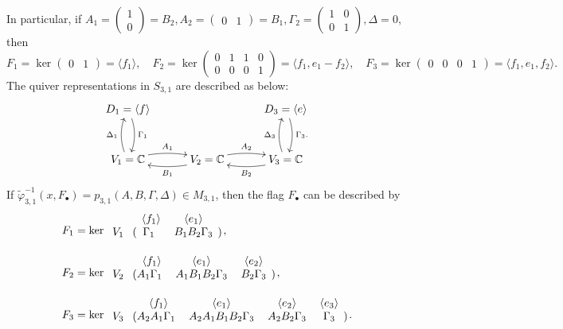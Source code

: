 \documentclass[11pt,reqno]{amsart}
\numberwithin{equation}{section}
\theoremstyle{definition}
\def\<{\langle}
\def\>{\rangle}
\newcommand{\inv}{^{-1}}
\newcommand{\tphi}{\widetilde{\varphi}}
\begin{document}
In particular, if 
$
A_1 = \begin{pmatrix}1 \\ 0\end{pmatrix} = B_2,
A_2 = \begin{pmatrix} 0 & 1 \end{pmatrix} = B_1,
\Gamma_2 = \begin{pmatrix}1&0\\0&1\end{pmatrix},
\Delta = 0,
$
then
\[
F_1 = \ker \begin{pmatrix} 0 & 1 \end{pmatrix} = \<f_1\>,
\quad
F_2 = \ker \begin{pmatrix} 0 & 1 &1& 0 \\ 0&0&0&1 \end{pmatrix} = \<f_1, e_1 - f_2\>,
\quad
F_3 = \ker \begin{pmatrix} 0 & 0 &0& 1  \end{pmatrix} = \<f_1, e_1, f_2\>.
\]
\endex
\ex
The quiver representations in $S_{3,1}$ are described as below:
\[
 \xymatrix@-1pc{
D_1=\<f\> \ar@/^/[dd]^{\Gamma_1} &&& &   D_3=\<e\>  \ar@/^/[dd]^{\Gamma_3.}  \\ 
 & & \\ 
V_1=\CC\ar@/^/[uu]^{\Delta_1} \ar@/^/[rr]^{A_1} 
& & \ar@/^/[ll]^{B_1}  V_2=\CC  \ar@/^/[rr]^{A_2}   
& & \ar@/^/[ll]^{B_2}  V_3=\CC  \ar@/^/[uu]^{\Delta_3}\\ 
 }
\] 
If $\tphi_{3,1}\inv(x, F_\bullet) =  p_{3,1}(A,B,\Gamma,\Delta) \in M_{3,1}$, then the flag $F_\bullet$ can be described by
\[
\begin{split}
F_1 &= 
 \ker \begin{blockarray}{ *{8}{c} }
 & \<f_1\> &\<e_1\>  \\
\begin{block}{ c @{\quad} ( @{\,} *{7}{c} @{\,} )}
V_{1}& 
\Gamma_1
&
B_1B_2\Gamma_3
\\
\end{block}
\end{blockarray}
\normalsize
~~~~~,
\\
F_2 &
= \ker \begin{blockarray}{ *{8}{c} }
 & \<f_1\> & \<e_1\>  & \<e_2\> \\
\begin{block}{ c @{\quad} ( @{\,} *{7}{c} @{\,} )}
V_{2}&
A_1\Gamma_1
& 
A_1B_1B_2\Gamma_3
&
B_2\Gamma_3
\\
\end{block}
\end{blockarray}
\normalsize
~~~~~,
\\
F_3 & =  \ker \begin{blockarray}{ *{8}{c} }
 & \<f_1\>& \<e_1\>  & \<e_2\> & \<e_3\>\\
\begin{block}{ c @{\quad} ( @{\,} *{7}{c} @{\,} )}
V_{3}& 
A_2A_1\Gamma_1
&
A_2A_1B_1B_2\Gamma_3
&
A_2B_2\Gamma_3
&
\Gamma_3
\\
\end{block}
\end{blockarray}
\normalsize
~~~~~.
\end{split}
\]
\end{document}
